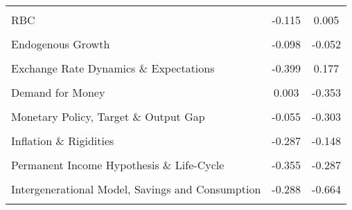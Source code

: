 \documentclass[
  12pt,
  onecolumn]{article}
\begin{document}
\begin{longtable}[t]{lcc}
\cellcolor{gray!6}{Monetary Policy, Financial Transmission \& Cycles 1} & \cellcolor{gray!6}{-0.151} & \cellcolor{gray!6}{0.044}\\
RBC & -0.115 & 0.005\\
\cellcolor{gray!6}{Coordination \& Sunspots 1} & \cellcolor{gray!6}{0.066} & \cellcolor{gray!6}{-0.208}\\
Endogenous Growth & -0.098 & -0.052\\
\addlinespace
\cellcolor{gray!6}{REH, Monetary Policy \& Business Cycles} & \cellcolor{gray!6}{-0.217} & \cellcolor{gray!6}{-0.001}\\
Exchange Rate Dynamics \& Expectations & -0.399 & 0.177\\
\cellcolor{gray!6}{Inflation, Interest Rates \& Expectations} & \cellcolor{gray!6}{-0.105} & \cellcolor{gray!6}{-0.168}\\
Demand for Money & 0.003 & -0.353\\
\cellcolor{gray!6}{Monetary Approach of Balance of Payments} & \cellcolor{gray!6}{-0.292} & \cellcolor{gray!6}{-0.059}\\
\addlinespace
Monetary Policy, Target \& Output Gap & -0.055 & -0.303\\
\cellcolor{gray!6}{Credit Rationing, Rational Expectations \& Imperfect Information} & \cellcolor{gray!6}{-0.160} & \cellcolor{gray!6}{-0.205}\\
Inflation \& Rigidities & -0.287 & -0.148\\
\cellcolor{gray!6}{New Theory of Money: Search, Bargaining...} & \cellcolor{gray!6}{-0.167} & \cellcolor{gray!6}{-0.365}\\
Permanent Income Hypothesis \& Life-Cycle & -0.355 & -0.287\\
\addlinespace
\cellcolor{gray!6}{Monetary Economics \& Demand for Money} & \cellcolor{gray!6}{-0.253} & \cellcolor{gray!6}{-0.475}\\
Intergenerational Model, Savings and Consumption & -0.288 & -0.664\\
\cellcolor{gray!6}{Marginal Taxation} & \cellcolor{gray!6}{-0.305} & \cellcolor{gray!6}{-0.976}\\*
\end{longtable}
\endgroup{}

\begingroup\fontsize{7}{9}\selectfont
\end{document}
